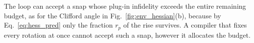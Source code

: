 The loop can accept a snap whose plug-in infidelity exceeds the entire remaining budget, as for the Clifford angle in Fig.~\ref{fig:env_hessian}(b), because by Eq.~\eqref{eq:hess_pred} only the fraction $r_p$ of the rise survives. A compiler that fixes every rotation at once cannot accept such a snap, however it allocates the budget.
